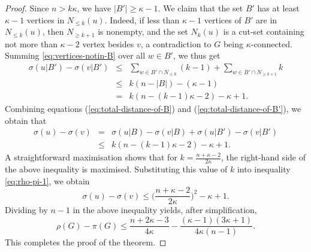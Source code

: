 \documentclass[10pt,a4paper]{amsart}
\begin{document}
\begin{proof}
Since $n > k \kappa$, we have $|B'| \geq \kappa-1$.
We claim that the set $B'$ has at least $\kappa-1$ vertices in $N_{\leq k}(u)$. 
Indeed, if less than $\kappa-1$ vertices of $B'$ are in $N_{\leq k}(u)$, then 
$N_{\geq k+1}$ is nonempty, and the set $N_k(u)$ is a cut-set containing not more than $\kappa-2$ 
vertex besides $v$, a contradiction to $G$ being $\kappa$-connected. 
Summing \eqref{eq:vertices-notin-B} over all \( w \in B' \), we thus get
\begin{eqnarray} 
\sigma(u|B') - \sigma(v|B')  
 & \leq & \sum_{w \in B' \cap N_{\leq k}} (k-1) + \sum_{w \in B' \cap N_{\geq k+1}} k \nonumber \\
 & \leq & k(n-|B|)-(\kappa-1) \nonumber \\ 
 & = & k(n - (k-1)\kappa-2)-\kappa+1. \label{eq:total-distance-of-B'}
\end{eqnarray}
Combining equations (\ref{eq:total-distance-of-B}) and (\ref{eq:total-distance-of-B'}), we obtain that
\begin{eqnarray}
\sigma(u) - \sigma(v) 
& = & \sigma(u|B) - \sigma(v|B) +\sigma(u|B') - \sigma(v|B') \nonumber  \\
& \leq &   k(n - (k-1)\kappa-2)-\kappa+1. \label{eq:rho-pi-1}
\end{eqnarray}
A straightforward maximisation shows that for \( k = \frac{n+\kappa-2}{2\kappa} \), the right-hand side of the above 
inequality is maximised. Substituting this value of \( k \) into inequality 
\eqref{eq:rho-pi-1}, we obtain
\[
\sigma(u) - \sigma(v) \leq \Big( \frac{n+\kappa-2}{2\kappa} \Big)^2 - \kappa + 1.
\]
Dividing by $n-1$ in the above inequality yields, after simplification,
\[
\rho(G) - \pi(G) \leq \frac{n+2\kappa-3}{4\kappa}   
                 - \frac{(\kappa-1)(3\kappa+1)}{4\kappa (n-1)}.
\]
This completes the proof of the theorem.
\end{proof}
\end{document}
